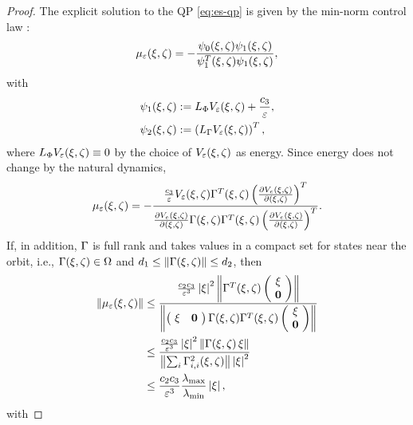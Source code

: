 \begin{proof}
  The explicit solution to the QP \eqref{eq:es-qp} is given by the min-norm control law \cite{Freeman1996}:
  \begin{align}
    \mu_{\varepsilon}(\xi, \zeta) = -\frac{\psi_{0}(\xi, \zeta) \psi_{1}(\xi, \zeta)}{\psi_{1}^{T}(\xi, \zeta) \psi_{1}(\xi, \zeta)},
  \end{align}
  with
  \begin{align}
    \nonumber
    \psi_{1}(\xi, \zeta) &:= L_{\Phi} V_{\varepsilon}(\xi, \zeta) + \frac{c_{3}}{\varepsilon},\\
    \psi_{2}(\xi, \zeta) &:= \left( L_{\Gamma} V_{\varepsilon}(\xi, \zeta) \right)^{T},
  \end{align}
  where $L_{\Phi} V_{\varepsilon}(\xi, \zeta) \equiv 0$ by the choice of $V_{\varepsilon}(\xi, \zeta)$ as energy.
  Since energy does not change by the natural dynamics,
  \begin{align}
    \mu_{\varepsilon}(\xi, \zeta) = - \frac{\frac{c_{3}}{\varepsilon} V_{\varepsilon}(\xi, \zeta) \Gamma^{T}(\xi, \zeta) \left( \frac{\partial{V_{e}(\xi, \zeta)}}{\partial{(\xi, \zeta)}} \right)^{T}}{\frac{\partial{V_{e}(\xi, \zeta)}}{\partial{(\xi, \zeta)}} \Gamma(\xi, \zeta) \Gamma^{T}(\xi, \zeta) \left( \frac{\partial{V_{e}(\xi, \zeta)}}{\partial{(\xi, \zeta)}} \right)^{T}}.
  \end{align}
  If, in addition, $\Gamma$ is full rank and takes values in a compact set for states near the orbit, i.e., $\Gamma(\xi, \zeta) \in \Omega$ and $d_{1} \leq \| \Gamma(\xi, \zeta) \| \leq d_{2}$, then
  \begin{align}
    \nonumber
    \| \mu_{\varepsilon}(\xi, \zeta) \|
    &\leq \frac{\frac{c_{2}c_{3}}{\varepsilon^3} \left|\xi\right|^{2} \left\| \Gamma^{T}(\xi, \zeta)
      \left(\!\begin{array}{c}
      \xi\\
      {\mathbf 0}
      \end{array}\!\right)\right\|}{\left\|
      \left(\!\begin{array}{c c}
      \xi & {\mathbf 0}
      \end{array}\!\right) \Gamma(\xi, \zeta) \Gamma^{T}(\xi, \zeta)
      \left(\!\begin{array}{c}
      \xi\\
      {\mathbf 0}
      \end{array}\!\right) \right\|}\\
    \nonumber
    &\leq \frac{\frac{c_{2}c_{3}}{\varepsilon^{3}} \left|\xi\right|^{2} \left\| \Gamma(\xi, \zeta)
      \, \xi \right\|}{\left\|
      \sum_{i} \Gamma_{i,i}^{2}(\xi, \zeta) \right\| \left|\xi\right|^{2}}\\
    \label{eq:mueps-bounds}
    &\leq \frac{c_{2}c_{3}}{\varepsilon^{3}} \frac{\lambda_{\mathrm{max}}}{\lambda_{\mathrm{min}}} \left|\xi\right|,
  \end{align}
  with

\end{proof}
